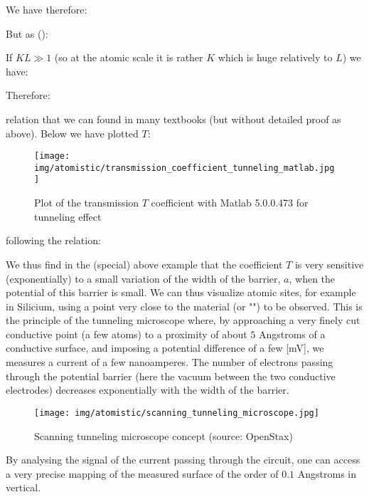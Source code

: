 	\begin{tcolorbox}[colframe=black,colback=white,sharp corners]
	
	We have therefore:
	
	But as ():
	
	If $KL\gg 1$ (so at the atomic scale it is rather $K$ which is huge relatively to $L$) we have:
	
	Therefore:
	
	relation that we can found in many textbooks (but without detailed proof as above). Below we have plotted $T$:
	\begin{figure}[H]
		\centering
		\texttt{[image: img/atomistic/transmission\_coefficient\_tunneling\_matlab.jpg]}	
		\caption{Plot of the transmission $T$ coefficient with Matlab 5.0.0.473 for tunneling effect}
	\end{figure}
	\end{tcolorbox}
	
	\begin{tcolorbox}[colframe=black,colback=white,sharp corners]
	following the relation:
	
	\end{tcolorbox}
	
	We thus find in the (special) above example that the coefficient $T$ is very sensitive (exponentially) to a small variation of the width of the barrier, $a$, when the potential of this barrier is small. We can thus visualize atomic sites, for example in Silicium, using a point very close to the material (or "") to be observed. This is the principle of the tunneling microscope where, by approaching a very finely cut conductive point (a few atoms) to a proximity of about $5$ Angstroms of a conductive surface, and imposing a potential difference of a few [mV], we measures a current of a few nanoamperes. The number of electrons passing through the potential barrier (here the vacuum between the two conductive electrodes) decreases exponentially with the width of the barrier.
	\begin{figure}[H]
		\centering
		\texttt{[image: img/atomistic/scanning\_tunneling\_microscope.jpg]}	
		\caption[Scanning tunneling microscope concept]{Scanning tunneling microscope concept (source: OpenStax)}
	\end{figure}
	By analysing the signal of  the current passing through the circuit, one can access a very precise mapping of the measured surface of the order of $0.1$ Angstroms in vertical.
	
